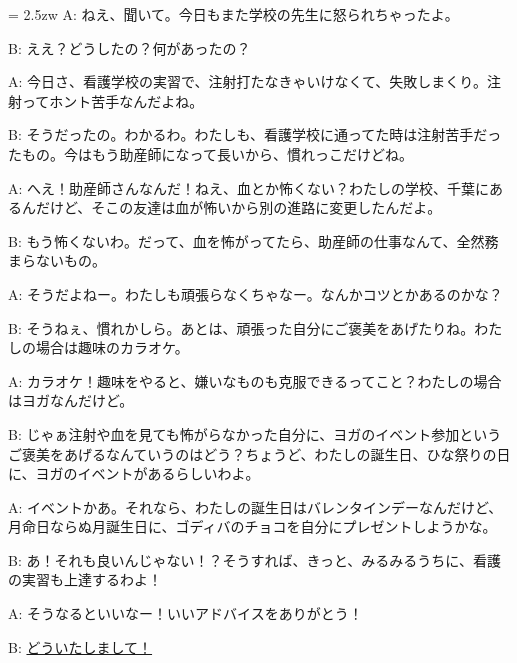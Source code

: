 \documentclass[11pt]{amsart}
\title{}
\author{}
\newenvironment{hangall}[1]{\hangindent = 2.5zw\everypar{\hangindent = 2.5zw}}{}
\begin{document}
\maketitle
\begin{hangall}{}%
A: ねえ、聞いて。今日もまた学校の先生に怒られちゃったよ。

B: ええ？どうしたの？何があったの？

A: 今日さ、看護学校の実習で、注射打たなきゃいけなくて、失敗しまくり。注射ってホント苦手なんだよね。

B: そうだったの。わかるわ。わたしも、看護学校に通ってた時は注射苦手だったもの。今はもう助産師になって長いから、慣れっこだけどね。

A: へえ！助産師さんなんだ！ねえ、血とか怖くない？わたしの学校、千葉にあるんだけど、そこの友達は血が怖いから別の進路に変更したんだよ。

B: もう怖くないわ。だって、血を怖がってたら、助産師の仕事なんて、全然務まらないもの。

A: そうだよねー。わたしも頑張らなくちゃなー。なんかコツとかあるのかな？

B: そうねぇ、慣れかしら。あとは、頑張った自分にご褒美をあげたりね。わたしの場合は趣味のカラオケ。

A: カラオケ！趣味をやると、嫌いなものも克服できるってこと？わたしの場合はヨガなんだけど。

B: じゃぁ注射や血を見ても怖がらなかった自分に、ヨガのイベント参加というご褒美をあげるなんていうのはどう？ちょうど、わたしの誕生日、ひな祭りの日に、ヨガのイベントがあるらしいわよ。

A: イベントかあ。それなら、わたしの誕生日はバレンタインデーなんだけど、月命日ならぬ月誕生日に、ゴディバのチョコを自分にプレゼントしようかな。

B: あ！それも良いんじゃない！？そうすれば、きっと、みるみるうちに、看護の実習も上達するわよ！

A: そうなるといいなー！いいアドバイスをありがとう！

B: \ul{どういたしまして！}\end{hangall}
\end{document}

